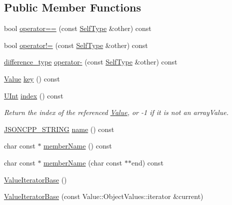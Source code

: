 \subsection*{Public Member Functions}
\begin{DoxyCompactItemize}
\item 
bool \hyperlink{classJson_1_1ValueIteratorBase_a1248d8016f88b51371a0fcbd355b3cfd_a1248d8016f88b51371a0fcbd355b3cfd}{operator==} (const \hyperlink{classJson_1_1ValueIteratorBase_a9d2a940d03ea06d20d972f41a89149ee_a9d2a940d03ea06d20d972f41a89149ee}{Self\+Type} \&other) const
\item 
bool \hyperlink{classJson_1_1ValueIteratorBase_aa83bdcc8114b7d040eb8eb42eeed5f4a_aa83bdcc8114b7d040eb8eb42eeed5f4a}{operator!=} (const \hyperlink{classJson_1_1ValueIteratorBase_a9d2a940d03ea06d20d972f41a89149ee_a9d2a940d03ea06d20d972f41a89149ee}{Self\+Type} \&other) const
\item 
\hyperlink{classJson_1_1ValueIteratorBase_a4e44bf8cbd17ec8d6e2c185904a15ebd_a4e44bf8cbd17ec8d6e2c185904a15ebd}{difference\+\_\+type} \hyperlink{classJson_1_1ValueIteratorBase_a98e254263fca5f1fc8fcac7bcb0260bf_a98e254263fca5f1fc8fcac7bcb0260bf}{operator-\/} (const \hyperlink{classJson_1_1ValueIteratorBase_a9d2a940d03ea06d20d972f41a89149ee_a9d2a940d03ea06d20d972f41a89149ee}{Self\+Type} \&other) const
\item 
\hyperlink{classJson_1_1Value}{Value} \hyperlink{classJson_1_1ValueIteratorBase_a3838ba39c43c518cf3ed4aa6ce78ccad_a3838ba39c43c518cf3ed4aa6ce78ccad}{key} () const
\item 
\hyperlink{namespaceJson_a800fb90eb6ee8d5d62b600c06f87f7d4_a800fb90eb6ee8d5d62b600c06f87f7d4}{U\+Int} \hyperlink{classJson_1_1ValueIteratorBase_a549c66a0bd20e9ae772175a5c0d2e88a_a549c66a0bd20e9ae772175a5c0d2e88a}{index} () const
\begin{DoxyCompactList}\small\item\em Return the index of the referenced \hyperlink{classJson_1_1Value}{Value}, or -\/1 if it is not an array\+Value. \end{DoxyCompactList}\item 
\hyperlink{json_8h_a1e723f95759de062585bc4a8fd3fa4be_a1e723f95759de062585bc4a8fd3fa4be}{J\+S\+O\+N\+C\+P\+P\+\_\+\+S\+T\+R\+I\+NG} \hyperlink{classJson_1_1ValueIteratorBase_a522989403c976fdbb94da846b99418db_a522989403c976fdbb94da846b99418db}{name} () const
\item 
char const  $\ast$ \hyperlink{classJson_1_1ValueIteratorBase_a54765da6759fd3f1edcbfbaf308ec263_a54765da6759fd3f1edcbfbaf308ec263}{member\+Name} () const
\item 
char const  $\ast$ \hyperlink{classJson_1_1ValueIteratorBase_a391c9cbd0edf9a447b37df00e8ce6059_a391c9cbd0edf9a447b37df00e8ce6059}{member\+Name} (char const $\ast$$\ast$end) const
\item 
\hyperlink{classJson_1_1ValueIteratorBase_af45b028d9ff9cbd2554a87878b42dd75_af45b028d9ff9cbd2554a87878b42dd75}{Value\+Iterator\+Base} ()
\item 
\hyperlink{classJson_1_1ValueIteratorBase_a640e990e5f03a96fd650122a2906f59d_a640e990e5f03a96fd650122a2906f59d}{Value\+Iterator\+Base} (const Value\+::\+Object\+Values\+::iterator \&current)
\end{DoxyCompactItemize}
